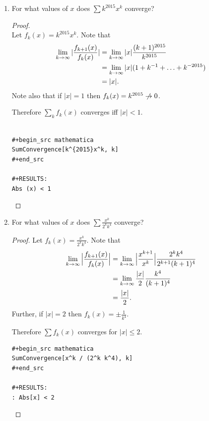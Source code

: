 \documentclass[12pt]{article}
\begin{document}
\begin{enumerate}[label=(\alph*)]
\item
  \begin{problem*}
    For what values of $x$ does $\sum k^{2015}x^k$ converge?
  \end{problem*}
  \begin{proof}~\\
    Let $f_k(x) = k^{2015}x^k$. Note that
    \begin{align*}
      \limk |\frac{f_{k+1}(x)}{f_k(x)}|
      &= \limk |x| \frac{(k+1)^{2015}}{k^{2015}}\\
      &= \limk |x| (1 + k^{-1} + \ldots + k^{-2015})\\
      &= |x|.
    \end{align*}
    Note also that if $|x| = 1$ then $f_k(x) = k^{2015} \centernot\to 0$.

    Therefore $\sum_k f_k(x)$ converges iff $|x| < 1$.
\begin{verbatim}

#+begin_src mathematica
SumConvergence[k^{2015}x^k, k]
#+end_src

#+RESULTS:
Abs (x) < 1
\end{verbatim}
\checkmark

  \end{proof}

\newpage
\item
  \begin{problem*}
    For what values of $x$ does $\sum \frac{x^k}{2^kk^4}$ converge?
  \end{problem*}
  \begin{proof}
    Let $f_k(x) = \frac{x^k}{2^kk^4}$. Note that
    \begin{align*}
      \limk \Big|\frac{f_{k+1}(x)}{f_k(x)}\Big|
      &= \limk \Big|\frac{x^{k+1}}{x^k}\Big|\frac{2^kk^4}{2^{k+1}(k+1)^4}\\
      &= \limk \frac{|x|}{2} \frac{k^4}{(k+1)^4}\\
      &= \frac{|x|}{2}.
    \end{align*}
    Further, if $|x| = 2$ then $f_k(x) = \pm \frac{1}{k^4}$.

    Therefore $\sum f_k(x)$ converges for $|x| \leq 2$.

\begin{verbatim}
#+begin_src mathematica
SumConvergence[x^k / (2^k k^4), k]
#+end_src

#+RESULTS:
: Abs[x] < 2

\end{verbatim}


\end{proof}
\end{enumerate}
\end{document}
